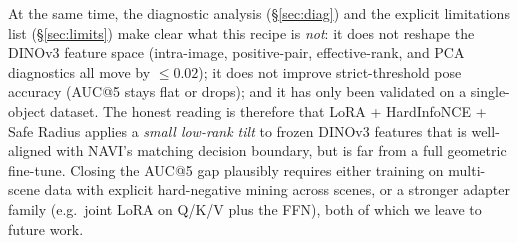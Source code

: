 \documentclass[11pt,a4paper]{article}
\begin{document}
At the same time, the diagnostic analysis (\S\ref{sec:diag}) and the explicit
limitations list (\S\ref{sec:limits}) make clear what this recipe is \emph{not}: it does not reshape
the DINOv3 feature space (intra-image, positive-pair, effective-rank, and PCA diagnostics all move by
$\le 0.02$); it does not improve strict-threshold pose accuracy (AUC@5 stays flat or drops); and it has
only been validated on a single-object dataset. The honest reading is therefore that LoRA + HardInfoNCE
+ Safe Radius applies a \emph{small low-rank tilt} to frozen DINOv3 features that is well-aligned with
NAVI's matching decision boundary, but is far from a full geometric fine-tune. Closing the AUC@5 gap
plausibly requires either training on multi-scene data with explicit hard-negative mining across
scenes, or a stronger adapter family (e.g.\ joint LoRA on Q/K/V plus the FFN), both of which we leave
to future work.

\newpage
\printbibliography[heading=bibintoc,title={References}]
\end{document}
